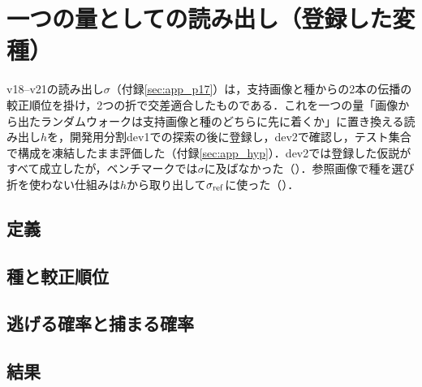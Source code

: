 \section{一つの量としての読み出し（登録した変種）}
\label{sec:app_h16}
v18--v21の読み出し$\sigma$（付録\ref{sec:app_p17}）は，支持画像と種からの2本の伝播の較正順位を掛け，2つの折で交差適合したものである．これを一つの量「画像から出たランダムウォークは支持画像と種のどちらに先に着くか」に置き換える読み出し$h$を，開発用分割dev1での探索の後に登録し，dev2で確認し，テスト集合で構成を凍結したまま評価した（付録\ref{sec:app_hyp}）．dev2では登録した仮説がすべて成立したが，ベンチマークでは$\sigma$に及ばなかった（）．参照画像で種を選び折を使わない仕組みは$h$から取り出して$\sigma_{\mathrm{ref}}$に使った（）．

\subsection{定義}
\label{sec:h19def}



\subsection{種と較正順位}
\label{sec:seed19}


\subsection{逃げる確率と捕まる確率}
\label{sec:sep19}


\subsection{結果}
\label{sec:app_h16res}

